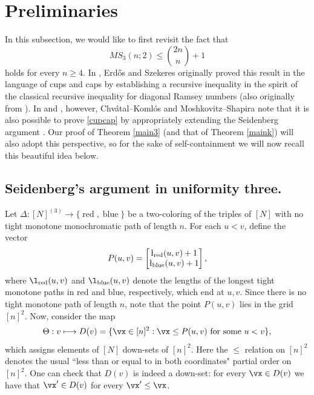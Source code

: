 \section{Preliminaries}\label{prelim}


In this subsection, we would like to first revisit the fact that
\begin{equation} \label{cupcap}
        MS_3(n; 2) \leq \binom{2n}{n} + 1
    \end{equation}
    holds for every $n \geq 4$. In \cite{ES35}, Erd\H{o}s and Szekeres originally proved this result in the language of cups and caps by establishing a recursive inequality in the spirit of the classical recursive inequality for diagonal Ramsey numbers (also originally from \cite{ES35}). In \cite{CK71} and \cite{MS14}, however, Chv\'atal--Koml\'os and Moshkovitz--Shapira note that it is also possible to prove \eqref{cupcap} by appropriately extending the Seidenberg argument \cite{Seid59}. Our proof of Theorem \ref{main3} (and that of Theorem \ref{maink}) will also adopt this perspective, so for the sake of self-containment we will now recall this beautiful idea below. 

   \subsection{Seidenberg's argument in uniformity three.} \label{Seidenberg} Let $\Delta: [N]^{(3)} \to \{\operatorname{red},\operatorname{blue}\}$ be a two-coloring of the triples of $[N]$ with no tight monotone monochromatic path of length $n$.
    For each $u < v$, define the vector
    \begin{equation*}
        P(u,v) = \begin{bmatrix}
            \l_{\text{red}}(u,v) + 1\\
            \l_{\text{blue}}(u,v) + 1
        \end{bmatrix},
    \end{equation*}
    where $\l_{\text{red}}(u,v)$ and $\l_{\text{blue}}(u,v)$ denote the lengths of the longest tight monotone paths in red and blue, respectively, which end at $u, v$.
    Since there is no tight monotone path of length $n$, note that the point $P(u,v)$ lies in the grid $[n]^2$. Now, consider the map
    \begin{equation*}
        \Theta: v \longmapsto D(v) = \{\vx \in [n]^2: \vx \leq P(u,v) \text{ for some } u < v\},
    \end{equation*}
    which assigns elements of $[N]$ down-sets of $[n]^2$. Here the $\leq$ relation on $[n]^2$ denotes the usual ``less than or equal to in both coordinates" partial order on $[n]^2$. One can check that $D(v)$ is indeed a down-set: for every $\vx \in D(v)$ we have that $\vx' \in D(v)$ for every $\vx' \leq \vx$. 
    
